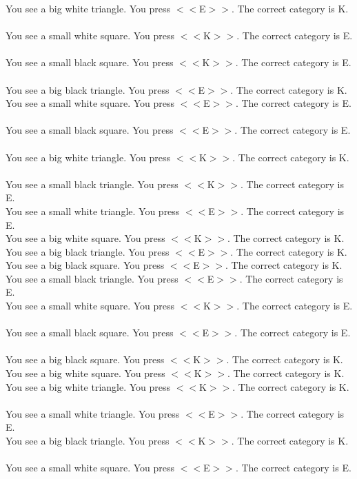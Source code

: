 \documentclass[pdflatex,sn-nature]{sn-jnl}%
\theoremstyle{thmstyleone}%
\theoremstyle{thmstyletwo}%
\theoremstyle{thmstylethree}%
\begin{document}
You see a big white triangle. You press $<<$E$>>$. The correct category is K. $~$\\ 
You see a small white square. You press $<<$K$>>$. The correct category is E. $~$\\ 
You see a small black square. You press $<<$K$>>$. The correct category is E. $~$\\ 
You see a big black triangle. You press $<<$E$>>$. The correct category is K. $~$\\ 
You see a small white square. You press $<<$E$>>$. The correct category is E. $~$\\ 
You see a small black square. You press $<<$E$>>$. The correct category is E. $~$\\ 
You see a big white triangle. You press $<<$K$>>$. The correct category is K. $~$\\ 
You see a small black triangle. You press $<<$K$>>$. The correct category is E. $~$\\ 
You see a small white triangle. You press $<<$E$>>$. The correct category is E. $~$\\ 
You see a big white square. You press $<<$K$>>$. The correct category is K. $~$\\ 
You see a big black triangle. You press $<<$E$>>$. The correct category is K. $~$\\ 
You see a big black square. You press $<<$E$>>$. The correct category is K. $~$\\ 
You see a small black triangle. You press $<<$E$>>$. The correct category is E. $~$\\ 
You see a small white square. You press $<<$K$>>$. The correct category is E. $~$\\ 
You see a small black square. You press $<<$E$>>$. The correct category is E. $~$\\ 
You see a big black square. You press $<<$K$>>$. The correct category is K. $~$\\ 
You see a big white square. You press $<<$K$>>$. The correct category is K. $~$\\ 
You see a big white triangle. You press $<<$K$>>$. The correct category is K. $~$\\ 
You see a small white triangle. You press $<<$E$>>$. The correct category is E. $~$\\ 
You see a big black triangle. You press $<<$K$>>$. The correct category is K. $~$\\ 
You see a small white square. You press $<<$E$>>$. The correct category is E. $~$\\ 
\end{document}
